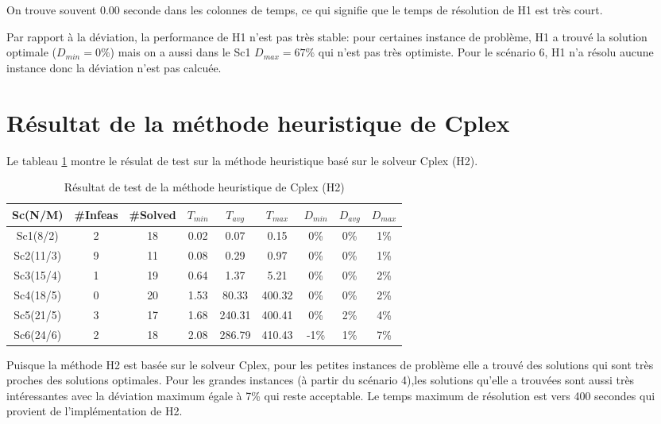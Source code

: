 \documentclass[twoside,fleqn]{EPURapport}
\begin{document}
On trouve souvent 0.00 seconde dans les colonnes de temps, ce qui signifie que le temps de résolution de H1 est très court.


Par rapport à la déviation, la performance de H1 n'est pas très stable: pour certaines instance de problème, H1 a trouvé la solution optimale ($D_{min}=0\%$) mais on a aussi dans le Sc1 $D_{max}=67\%$ qui n'est pas très optimiste. Pour le scénario 6, H1 n'a résolu aucune instance donc la déviation n'est pas calcuée.


\section{Résultat de la méthode heuristique de Cplex}
Le tableau \ref{tab_h2} montre le résulat de test sur la méthode heuristique basé sur le solveur Cplex (H2).


\begin{table}[h]
    \centering
    \begin{tabular}{|c|c|c|c|c|c|c|c|c|}
    	\hline
    	Sc(N/M)	& \#Infeas & \#Solved	& $T_{min}$ & $T_{avg}$	& $T_{max}$ & $D_{min}$ & $D_{avg}$	& $D_{max}$ \\ \hline
		Sc1(8/2)  &2 & 18 &  0.02 &  0.07   &0.15     &0\%  &0\%  &1\% \\ \hline
Sc2(11/3) &9 & 11 &  0.08 &  0.29   &0.97     &0\%  &0\%  &1\% \\ \hline
Sc3(15/4) &1 & 19 &  0.64 &  1.37   &5.21     &0\%  &0\%  &2\% \\ \hline
Sc4(18/5) &0 & 20 &  1.53 &  80.33  & 400.32  &0\%  &0\%  &2\% \\ \hline
Sc5(21/5) &3 & 17 &  1.68 &  240.31 &  400.41 & 0\% & 2\% & 4\% \\ \hline
Sc6(24/6) &2 & 18 &  2.08 &  286.79 &  410.43 & -1\%&  1\%&  7\% \\ \hline
    \end{tabular}
    \label{tab_h2}
    \caption{Résultat de test de la méthode heuristique de Cplex (H2)}
\end{table}
\bigskip


Puisque la méthode H2 est basée sur le solveur Cplex, pour les petites instances de problème elle a trouvé des solutions qui sont très proches des solutions optimales. Pour les grandes instances (à partir du scénario 4),les solutions qu'elle a trouvées sont aussi très intéressantes avec la déviation maximum égale à 7\% qui reste acceptable. Le temps maximum de résolution est vers 400 secondes qui provient de l'implémentation de H2.
\end{document}
